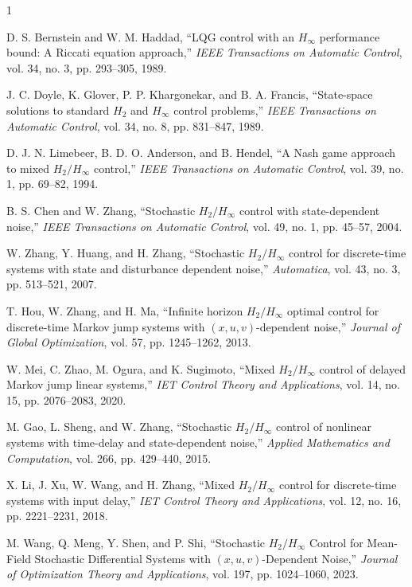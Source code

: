\documentclass[lettersize,journal]{IEEEtran}
\theoremstyle{plain}
\theoremstyle{definition}
\begin{document}
\begin{thebibliography}{1}



D. S. Bernstein and W. M. Haddad, ``LQG control with an $H_\infty$ performance bound: A Riccati equation approach,'' \textit{IEEE Transactions on Automatic Control}, vol. 34, no. 3, pp. 293--305, 1989.

J. C. Doyle, K. Glover, P. P. Khargonekar, and B. A. Francis, ``State-space solutions to standard $H_2$ and $H_\infty$ control problems,'' \textit{IEEE Transactions on Automatic Control}, vol. 34, no. 8, pp. 831--847, 1989.

D. J. N. Limebeer, B. D. O. Anderson, and B. Hendel, ``A Nash game approach to mixed $H_2/H_\infty$ control,'' \textit{IEEE Transactions on Automatic Control}, vol. 39, no. 1, pp. 69--82, 1994.

B. S. Chen and W. Zhang, ``Stochastic $H_2/H_\infty$ control with state-dependent noise,'' \textit{IEEE Transactions on Automatic Control}, vol. 49, no. 1, pp. 45--57, 2004.

W. Zhang, Y. Huang, and H. Zhang, ``Stochastic $H_2/H_\infty$ control for discrete-time systems with state and disturbance dependent noise,'' \textit{Automatica}, vol. 43, no. 3, pp. 513--521, 2007.

T. Hou, W. Zhang, and H. Ma, ``Infinite horizon $H_2/H_\infty$ optimal control for discrete-time Markov jump systems with $(x, u, v)$-dependent noise,'' \textit{Journal of Global Optimization}, vol. 57, pp. 1245--1262, 2013.

W. Mei, C. Zhao, M. Ogura, and K. Sugimoto, ``Mixed $H_2/H_\infty$ control of delayed Markov jump linear systems,'' \textit{IET Control Theory and Applications}, vol. 14, no. 15, pp. 2076--2083, 2020.

M. Gao, L. Sheng, and W. Zhang, ``Stochastic $H_2/H_\infty$ control of nonlinear systems with time-delay and state-dependent noise,'' \textit{Applied Mathematics and Computation}, vol. 266, pp. 429--440, 2015.

X. Li, J. Xu, W. Wang, and H. Zhang, ``Mixed $H_2/H_\infty$ control for discrete-time systems with input delay,'' \textit{IET Control Theory and Applications}, vol. 12, no. 16, pp. 2221--2231, 2018.

M. Wang, Q. Meng, Y. Shen, and P. Shi, ``Stochastic $H_2/H_\infty$ Control for Mean-Field Stochastic Differential Systems with $(x, u, v)$-Dependent Noise,'' \textit{Journal of Optimization Theory and Applications}, vol. 197, pp. 1024--1060, 2023.


\end{thebibliography}
\end{document}
